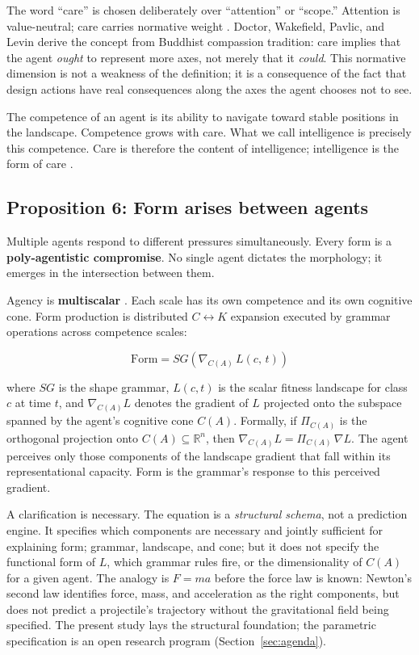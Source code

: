 The word ``care'' is chosen deliberately over ``attention'' or ``scope.'' Attention is value-neutral; care carries normative weight \parencite{Doctor2024}. Doctor, Wakefield, Pavlic, and Levin derive the concept from Buddhist compassion tradition: care implies that the agent \textit{ought} to represent more axes, not merely that it \textit{could}. This normative dimension is not a weakness of the definition; it is a consequence of the fact that design actions have real consequences along the axes the agent chooses not to see.

The competence of an agent is its ability to navigate toward stable positions in the landscape. Competence grows with care. What we call intelligence is precisely this competence. Care is therefore the content of intelligence; intelligence is the form of care \parencite{Doctor2024}.

\subsection{Proposition 6: Form arises between agents}
\label{sec:prop6}

Multiple agents respond to different pressures simultaneously. Every form is a \textbf{poly-agentistic compromise}. No single agent dictates the morphology; it emerges in the intersection between them.

Agency is \textbf{multiscalar} \parencite{Levin2022}. Each scale has its own competence and its own cognitive cone. Form production is distributed $C \leftrightarrow K$ expansion executed by grammar operations across competence scales:

\begin{equation}
\mathrm{Form} = SG\!\left(\nabla_{C(A)}\, L(c,\, t)\right)
\label{eq:core}
\end{equation}

\noindent where $SG$ is the shape grammar, $L(c,t)$ is the scalar fitness landscape for class $c$ at time $t$, and $\nabla_{C(A)} L$ denotes the gradient of $L$ projected onto the subspace spanned by the agent's cognitive cone $C(A)$. Formally, if $\Pi_{C(A)}$ is the orthogonal projection onto $C(A) \subseteq \mathbb{R}^n$, then $\nabla_{C(A)} L = \Pi_{C(A)}\, \nabla L$. The agent perceives only those components of the landscape gradient that fall within its representational capacity. Form is the grammar's response to this perceived gradient.

A clarification is necessary. The equation is a \textit{structural schema}, not a prediction engine. It specifies which components are necessary and jointly sufficient for explaining form; grammar, landscape, and cone; but it does not specify the functional form of $L$, which grammar rules fire, or the dimensionality of $C(A)$ for a given agent. The analogy is $F = ma$ before the force law is known: Newton's second law identifies force, mass, and acceleration as the right components, but does not predict a projectile's trajectory without the gravitational field being specified. The present study lays the structural foundation; the parametric specification is an open research program (Section~\ref{sec:agenda}).


